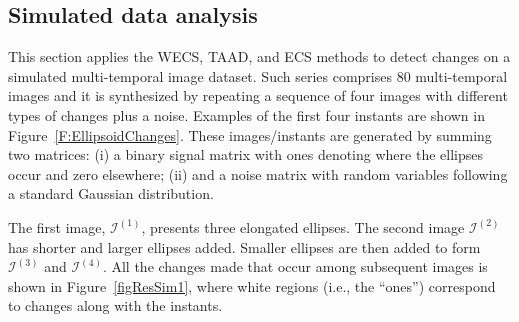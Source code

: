 \documentclass[journal]{IEEEtran}
\begin{document}
%
%
%
%
%






\subsection{Simulated data analysis}\label{secExpSimulated}

This section applies the WECS, TAAD, and ECS methods to detect changes on a simulated multi-temporal image dataset. 
Such series comprises 80 multi-temporal images and it is synthesized by repeating a sequence of four images with different types of changes plus a noise. 
Examples of the first four instants are shown in Figure~\ref{F:EllipsoidChanges}. 
These images/instants are generated by summing two matrices: (i) a binary signal matrix with ones denoting where the ellipses occur and zero elsewhere; (ii) and a noise matrix with random variables following a standard Gaussian distribution. 

The first image, $\mathcal{I}^{(1)}$, presents three elongated ellipses. The second image $\mathcal{I}^{(2)}$ has shorter and larger ellipses added. Smaller ellipses are then added to form $\mathcal{I}^{(3)}$ and $\mathcal{I}^{(4)}$. All the changes made that occur among subsequent images is shown in Figure~\ref{figResSim1}, where white regions (i.e., the ``ones'') correspond to changes along with the instants.
\end{document}
